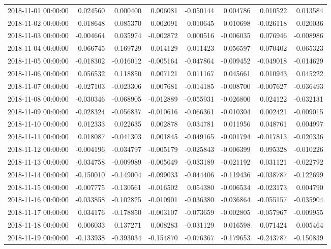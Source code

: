\begin{tabular}{lrrrrrrr}
2018-11-01 00:00:00 & 0.024560 & 0.000400 & 0.006081 & -0.050144 & 0.004786 & 0.010522 & 0.013584 \\
2018-11-02 00:00:00 & 0.018648 & 0.085370 & 0.002091 & 0.010645 & 0.010698 & -0.026118 & 0.020036 \\
2018-11-03 00:00:00 & -0.004664 & 0.035974 & -0.002872 & 0.000516 & -0.006035 & 0.076946 & -0.008986 \\
2018-11-04 00:00:00 & 0.066745 & 0.169729 & 0.014129 & -0.011423 & 0.056597 & -0.070402 & 0.065323 \\
2018-11-05 00:00:00 & -0.018302 & -0.016012 & -0.005164 & -0.047864 & -0.009452 & -0.049018 & -0.014629 \\
2018-11-06 00:00:00 & 0.056532 & 0.118850 & 0.007121 & 0.011167 & 0.045661 & 0.010943 & 0.045222 \\
2018-11-07 00:00:00 & -0.027103 & -0.023306 & 0.007681 & -0.014185 & -0.008700 & -0.007627 & -0.036493 \\
2018-11-08 00:00:00 & -0.030346 & -0.068905 & -0.012889 & -0.055931 & -0.026800 & 0.024122 & -0.032131 \\
2018-11-09 00:00:00 & -0.028324 & -0.056837 & -0.010616 & -0.066361 & -0.010304 & 0.002421 & -0.009015 \\
2018-11-10 00:00:00 & 0.012333 & 0.022635 & 0.002878 & 0.034781 & 0.011956 & 0.048761 & 0.004997 \\
2018-11-11 00:00:00 & 0.018087 & -0.041303 & 0.001845 & -0.049165 & -0.001794 & -0.017813 & -0.020336 \\
2018-11-12 00:00:00 & -0.004196 & -0.034797 & -0.005179 & -0.025843 & -0.006399 & 0.095328 & -0.010226 \\
2018-11-13 00:00:00 & -0.034758 & -0.009989 & -0.005649 & -0.033189 & -0.021192 & 0.031121 & -0.022792 \\
2018-11-14 00:00:00 & -0.150010 & -0.149004 & -0.099033 & -0.044406 & -0.119436 & -0.038787 & -0.122699 \\
2018-11-15 00:00:00 & -0.007775 & -0.130561 & -0.016502 & 0.054380 & -0.006534 & -0.023173 & 0.004790 \\
2018-11-16 00:00:00 & -0.033858 & -0.102825 & -0.010901 & -0.036380 & -0.036864 & -0.055157 & -0.035904 \\
2018-11-17 00:00:00 & 0.034176 & -0.178850 & -0.003107 & -0.073659 & -0.002805 & -0.057967 & -0.009955 \\
2018-11-18 00:00:00 & 0.006033 & 0.137271 & 0.008283 & -0.031129 & 0.016598 & 0.071424 & 0.005464 \\
2018-11-19 00:00:00 & -0.133938 & -0.393034 & -0.154870 & -0.076367 & -0.179653 & -0.243787 & -0.150839 \\

\end{tabular}
